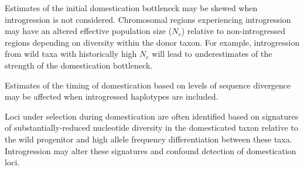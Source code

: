 \documentclass[11pt]{article}
\newcommand{\lwang}[1]{\textcolor{red}{ \emph{\scriptsize  #1}} } %
\newcommand{\gmj}[1]{\textcolor{blue}{ \emph{\scriptsize  #1}} } %
\begin{document}
Estimates of the initial domestication bottleneck may be skewed when introgression is not considered.
Chromosomal regions experiencing introgression may have an altered effective population size ($N_e$) relative to non-introgressed regions depending on diversity within the donor taxon.
For example, introgression from wild taxa with historically high $N_e$ will lead to underestimates of the strength of the domestication bottleneck.


Estimates of the timing of domestication based on levels of sequence divergence may be affected when introgressed haplotypes are included.


Loci under selection during domestication are often identified based on signatures of substantially-reduced nucleotide diversity in the domesticated taxon relative to the wild progenitor and high allele frequency differentiation between these taxa.
Introgression may alter these signatures and confound detection of domestication loci.
\end{document}
